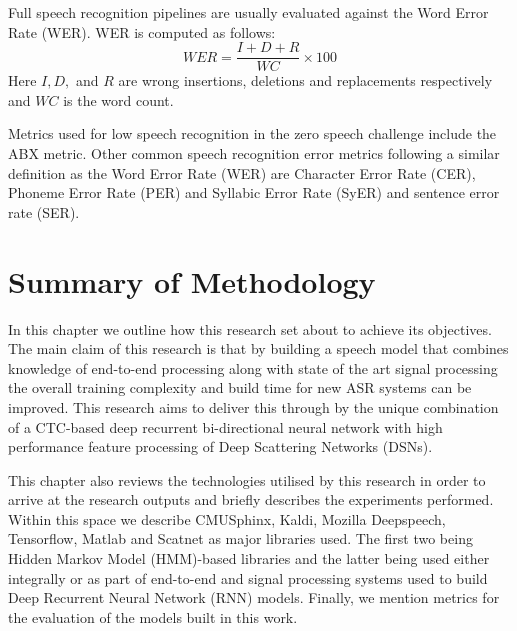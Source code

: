 Full speech recognition pipelines are usually evaluated against the Word Error Rate (WER).  WER is computed as follows:
\begin{equation}\label{eqn_2_3_wer}
WER=\frac{I+D+R}{WC}\times 100
\end{equation}
Here $I,D,$ and $R$ are wrong insertions, deletions and replacements respectively and $WC$ is the word count.

Metrics used for low speech recognition in the zero speech challenge \citep{versteegh2015zero} include the ABX metric. Other common speech recognition error metrics following a similar definition as the Word Error Rate (WER) are Character Error Rate (CER), Phoneme Error Rate (PER) and Syllabic Error Rate (SyER) and sentence error rate (SER).

\section{Summary of Methodology}
In this chapter we outline how this research set about to achieve its objectives.  The main claim of this research is that by building a speech model that combines knowledge of end-to-end processing along with state of the art signal processing the overall training complexity and build time for new ASR systems can be improved.  This research aims to deliver this through by the unique combination of a CTC-based deep recurrent bi-directional neural network with high performance feature processing of Deep Scattering Networks (DSNs).

This chapter also reviews the technologies utilised by this research in order to arrive at the research outputs and briefly describes the experiments performed.  Within this space we describe CMUSphinx, Kaldi, Mozilla Deepspeech, Tensorflow, Matlab and Scatnet as major libraries used.   The first two being Hidden Markov Model (HMM)-based libraries and the latter being used either integrally or as part of end-to-end  and signal processing systems used to build Deep Recurrent Neural Network (RNN) models. Finally, we mention metrics for the evaluation of the models built in this work.
